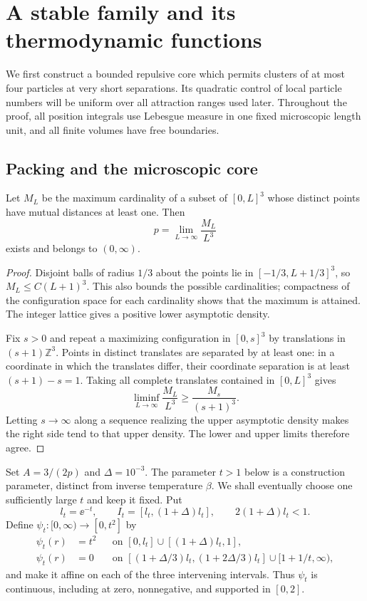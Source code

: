 \section{A stable family and its thermodynamic functions}
\label{f:section}

We first construct a bounded repulsive core which permits clusters of at
most four particles at very short separations.  Its quadratic control of
local particle numbers will be uniform over all attraction ranges used
later.  Throughout the proof, all position integrals use Lebesgue measure
in one fixed microscopic length unit, and all finite volumes have free
boundaries.

\subsection{Packing and the microscopic core}

\begin{lemma}\label{f:packing}
Let $M_L$ be the maximum cardinality of a subset of $[0,L]^3$ whose
distinct points have mutual distances at least one.  Then
\[
  p=\lim_{L\to\infty}\frac{M_L}{L^3}
\]
exists and belongs to $(0,\infty)$.
\end{lemma}

\begin{proof}
Disjoint balls of radius $1/3$ about the points lie in
$[-1/3,L+1/3]^3$, so $M_L\le C(L+1)^3$.  This also bounds the
possible cardinalities; compactness of the configuration space for each
cardinality shows that the maximum is attained.  The integer lattice
gives a positive lower asymptotic density.

Fix $s>0$ and repeat a maximizing configuration in $[0,s]^3$ by
translations in $(s+1)\mathbb Z^3$.  Points in distinct translates are
separated by at least one: in a coordinate in which the translates
differ, their coordinate separation is at least $(s+1)-s=1$.
Taking all complete translates contained in $[0,L]^3$ gives
\[
 \liminf_{L\to\infty}\frac{M_L}{L^3}
 \ge \frac{M_s}{(s+1)^3}.
\]
Letting $s\to\infty$ along a sequence realizing the upper asymptotic
density makes the right side tend to that upper density.  The lower
and upper limits therefore agree.
\end{proof}

Set $A=3/(2p)$ and $\Delta=10^{-3}$.  The parameter $t>1$ below is a
construction parameter, distinct from inverse temperature $\beta$.
We shall eventually choose one sufficiently large $t$ and keep it
fixed.  Put
\[
 l_t=\ee^{-t},\qquad I_t=[l_t,(1+\Delta)l_t],
 \qquad 2(1+\Delta)l_t<1.
\]
Define $\psi_t:[0,\infty)\to[0,t^2]$ by
\begin{equation}\label{f:core}
 \begin{aligned}
 \psi_t(r)&=t^2
   &&\text{on }[0,l_t]\cup[(1+\Delta)l_t,1],\\
 \psi_t(r)&=0
   &&\text{on }[(1+\Delta/3)l_t,(1+2\Delta/3)l_t]
                    \cup[1+1/t,\infty),
 \end{aligned}
\end{equation}
and make it affine on each of the three intervening intervals.  Thus
$\psi_t$ is continuous, including at zero, nonnegative, and supported
in $[0,2]$.

